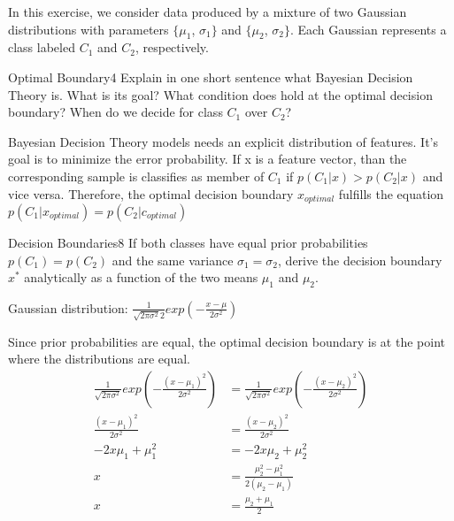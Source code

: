 \newif\ifvimbug
\vimbugfalse

\ifvimbug

\fi

In this exercise, we consider data produced by a mixture of two Gaussian distributions with parameters $\{\mu_1$, $\sigma_1\}$ and $\{\mu_2$, $\sigma_2\}$. Each Gaussian represents a class labeled $C_1$ and $C_2$, respectively. 

\begin{questions}


\begin{question}{Optimal Boundary}{4}
Explain in one short sentence what Bayesian Decision Theory is. What is its goal? 
What condition does hold at the optimal decision boundary? When do we decide for class $C_1$ over $C_2$?

\begin{answer}
	Bayesian Decision Theory models needs an explicit distribution of features. It's goal is to minimize the error probability. If x is a feature vector, than the corresponding sample is classifies as member of $C_1$ if $p(C_1 | x) > p(C_2|x)$ and vice versa. Therefore, the optimal decision boundary $x_{optimal}$ fulfills the equation $p(C_1 | x_{optimal}) = p(C_2 | c_{optimal})$

\end{answer}

\end{question}



\begin{question}{Decision Boundaries}{8}
If both classes have equal prior probabilities $p(C_1) = p(C_2)$ and the same variance $\sigma_1 = \sigma_2$, derive the decision boundary $x^*$ analytically as a function of the two means $\mu_1$ and $\mu_2$.

\begin{answer}
	Gaussian distribution: $\frac{1}{\sqrt{2 \pi \sigma^2 }2} exp(- \frac{x-\mu}{2 \sigma ^2})$
	
	Since prior probabilities are equal, the optimal decision boundary is at the point where the distributions are equal.
	\begin{align*}
		\frac{1}{\sqrt{2 \pi \sigma^2 }} exp(- \frac{(x-\mu_1)^2}{2 \sigma ^2})
		&= 		\frac{1}{\sqrt{2 \pi \sigma^2 }} exp(- \frac{(x-\mu_2)^2}{2 \sigma ^2})\\
		\frac{(x-\mu_1)^2}{2 \sigma ^2}
		&= \frac{(x-\mu_2)^2}{2 \sigma ^2}\\
		-2x\mu_1 + \mu_1^2 &= -2x\mu_2 + \mu_2^2\\
		x &= \frac{\mu_2^2 - \mu_1^2}{2(\mu_2 - \mu_1)}\\
		x &= \frac{\mu_2 + \mu_1}{2}
	\end{align*}
	

\end{answer}
\end{question}
\end{questions}
